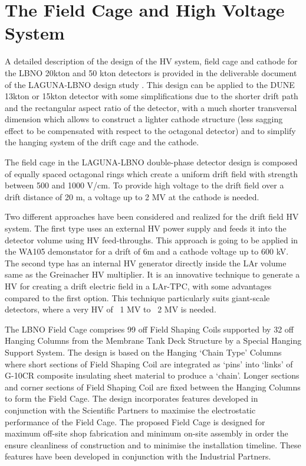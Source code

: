 \section{The Field Cage and High Voltage System} 
\label{sec:detectors-fd-alt-hv}

A detailed description of the design of the HV system, field cage and cathode for the LBNO 20kton and 50 kton detectors is provided in the deliverable document of the LAGUNA-LBNO design study \cite{LAGUNA-LBNO-deliv}. This design can be applied to the DUNE 13kton or 15kton detector with some simplifications due to the shorter drift path and the rectangular aspect ratio of the detector, with a much shorter transversal dimension which allows to construct a lighter cathode structure (less sagging effect to be compensated with respect to the octagonal detector) and to simplify the hanging system of the drift cage and the cathode.

The field cage in the LAGUNA-LBNO double-phase detector design  is composed of equally spaced octagonal rings which create a uniform drift field with strength between 500 and 1000 V/cm. To provide high voltage to the drift field over a drift distance of 20 m, a voltage up to 2 MV at the cathode is needed. 

Two different approaches have been considered and realized for the drift field HV system. The first type uses an external HV power supply and feeds it into the detector volume using HV feed-throughs. This approach is going to be applied in the WA105 demonstator for a drift of 6m and a cathode voltage up to 600 kV.  The second type has an internal HV generator directly inside the LAr volume same as the Greinacher HV multiplier. It is an innovative technique to generate a HV for creating a drift electric field in a LAr-TPC, with some advantages compared to the first option. This technique particularly suits giant-scale detectors, where a very HV of ~1 MV to ~2 MV is needed.

The LBNO Field Cage comprises 99 off Field Shaping Coils supported by 32 off Hanging Columns from the Membrane Tank Deck Structure by a Special Hanging Support System.  The design is based on the Hanging ‘Chain Type’ Columns where short sections of Field Shaping Coil are integrated as ‘pins’ into ‘links’ of G-10CR composite insulating sheet material to produce a ‘chain’.  Longer sections and corner sections of Field Shaping Coil are fixed between the Hanging Columns to form the Field Cage.  The design incorporates features developed in conjunction with the Scientific Partners to maximise the electrostatic performance of the Field Cage. The proposed Field Cage is designed for maximum off-site shop fabrication and minimum on-site assembly in order the ensure cleanliness of construction and to minimise the installation timeline.  These features have been developed in conjunction with the Industrial Partners.

